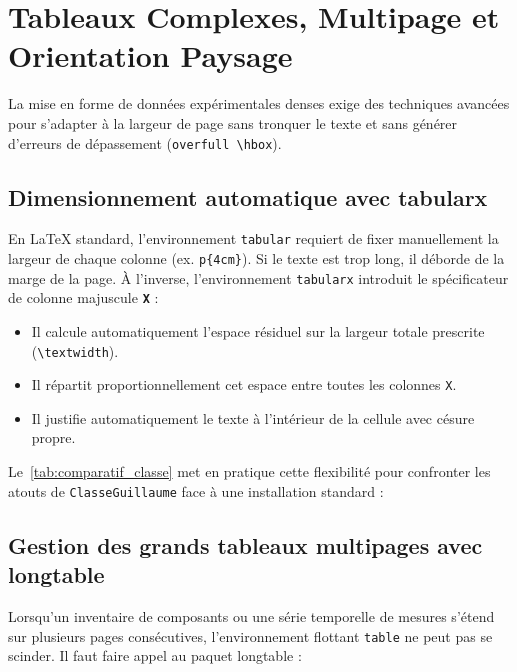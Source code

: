 \section{Tableaux Complexes, Multipage et Orientation Paysage}
\label{sec:tableaux_avances}

La mise en forme de données expérimentales denses exige des techniques avancées pour s'adapter à la largeur de page sans tronquer le texte et sans générer d'erreurs de dépassement (\texttt{overfull \textbackslash hbox}).

\subsection{Dimensionnement automatique avec \textsf{tabularx}}
\label{subsec:tabularx_auto}

En \LaTeX{} standard, l'environnement \texttt{tabular} requiert de fixer manuellement la largeur de chaque colonne (ex. \texttt{p\{4cm\}}).
Si le texte est trop long, il déborde de la marge de la page.
À l'inverse, l'environnement \texttt{tabularx} introduit le spécificateur de colonne majuscule \textbf{\texttt{X}} :
\begin{itemize}
  \item Il calcule automatiquement l'espace résiduel sur la largeur totale prescrite (\texttt{\textbackslash textwidth}).
  \item Il répartit proportionnellement cet espace entre toutes les colonnes \texttt{X}.
  \item Il justifie automatiquement le texte à l'intérieur de la cellule avec césure propre.
\end{itemize}

Le~\cref{tab:comparatif_classe} met en pratique cette flexibilité pour confronter les atouts de \texttt{ClasseGuillaume} face à une installation standard :



\subsection{Gestion des grands tableaux multipages avec \textsf{longtable}}
\label{subsec:longtable_multipage}

Lorsqu'un inventaire de composants ou une série temporelle de mesures s'étend sur plusieurs pages consécutives, l'environnement flottant \texttt{table} ne peut pas se scinder.
Il faut faire appel au paquet \textsf{longtable} :

